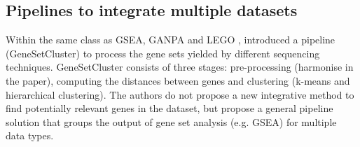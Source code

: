 



\subsection*{Pipelines to integrate multiple datasets} \label{s:pipelines}


Within the same class as GSEA, GANPA and LEGO \citep{Fan2020-yb, Dong2016-zs}, \citet{Ewing2020-os} introduced a pipeline (GeneSetCluster) to process the gene sets yielded by different sequencing techniques. GeneSetCluster consists of three stages: pre-processing (harmonise in the paper), computing the distances between genes and clustering (k-means and hierarchical clustering). The authors do not propose a new integrative method to find potentially relevant genes in the dataset, but propose a general pipeline solution that groups the output of gene set analysis (e.g. GSEA) for multiple data types.


